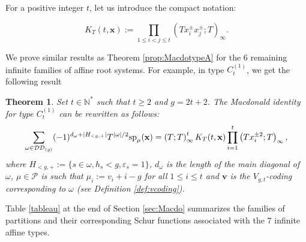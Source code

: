 \documentclass[11pt,letterpaper]{amsart}
\def\ccdd{\mathcal {DD}}
\def\ccp{\mathcal P}
\newtheorem{thm}[df]{Theorem}
\renewcommand{\sp}{\mathrm{sp}}
\numberwithin{equation}{section}
\numberwithin{df}{section}
\begin{document}
 For a positive integer $t$, let us introduce the compact notation:

\begin{equation}\label{eq:kt}
 K_T(t,\mathbf{x}):=\prod_{1\leq i<j\leq t}\left(Tx_i^{\pm} x_j^{\pm};T\right)_\infty.
\end{equation}


We prove similar results as Theorem \ref{prop:MacdotypeA} for the $6$ remaining infinite families of affine root systems. For example, in type $C^{(1)}_{t}$, we get the following result
\begin{thm}\label{prop:MacdotypeC}
Set $t\in\mathbb{N}^*$ such that $t\geq 2$ and $g=2t+2$. The Macdonald identity for type $C^{(1)}_{t}$ can be rewritten as follows:
\begin{equation}\label{eq:macdoc}
\sum_{\omega\in\ccdd_{(g)}} (-1)^{d_{\omega}+\lvert H_{<g,+}\rvert}T^{\lvert\omega\rvert/2}\sp_{\mu}({\bf x})=
\left(T;T\right)_\infty^tK_T(t,{\bf x})
\prod_{i=1}^t \left(Tx_i^{\pm 2};T\right)_\infty ,
\end{equation}
where $H_{<g,+}:=\lbrace s\in\omega, h_s<g, \varepsilon_s=1\rbrace$, $d_\omega$ is the length of the main diagonal of $\omega$, $\mu\in\ccp$ is such that
$\mu_i:=v_i+i-g$ for all $1\leq i \leq t$ and $\mathbf{v}$ is the $V_{g,t}$-coding corresponding to $\omega$ (see Definition \ref{def:vcoding}).
\end{thm}

Table \ref{tableau} at the end of Section \ref{sec:Macdo} summarizes the families of partitions and their corresponding Schur functions associated with the $7$ infinite affine types.
\end{document}
